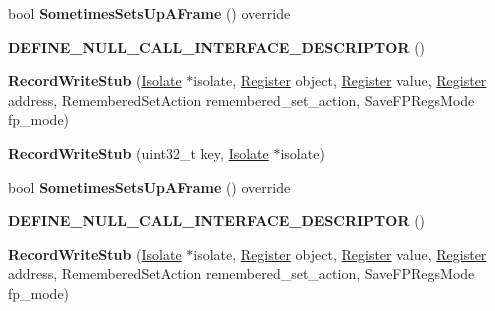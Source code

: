 \begin{DoxyCompactItemize}
\item 
bool {\bfseries Sometimes\+Sets\+Up\+A\+Frame} () override\hypertarget{classv8_1_1internal_1_1_record_write_stub_a636954d69a10f35b09d319f92e167699}{}\label{classv8_1_1internal_1_1_record_write_stub_a636954d69a10f35b09d319f92e167699}

\item 
{\bfseries D\+E\+F\+I\+N\+E\+\_\+\+N\+U\+L\+L\+\_\+\+C\+A\+L\+L\+\_\+\+I\+N\+T\+E\+R\+F\+A\+C\+E\+\_\+\+D\+E\+S\+C\+R\+I\+P\+T\+OR} ()\hypertarget{classv8_1_1internal_1_1_record_write_stub_a886f020173ce417f40c5704f6a582d6f}{}\label{classv8_1_1internal_1_1_record_write_stub_a886f020173ce417f40c5704f6a582d6f}

\item 
{\bfseries Record\+Write\+Stub} (\hyperlink{classv8_1_1internal_1_1_isolate}{Isolate} $\ast$isolate, \hyperlink{structv8_1_1internal_1_1_register}{Register} object, \hyperlink{structv8_1_1internal_1_1_register}{Register} value, \hyperlink{structv8_1_1internal_1_1_register}{Register} address, Remembered\+Set\+Action remembered\+\_\+set\+\_\+action, Save\+F\+P\+Regs\+Mode fp\+\_\+mode)\hypertarget{classv8_1_1internal_1_1_record_write_stub_a6f773cf58e28bfb7b2c5da464fd3f145}{}\label{classv8_1_1internal_1_1_record_write_stub_a6f773cf58e28bfb7b2c5da464fd3f145}

\item 
{\bfseries Record\+Write\+Stub} (uint32\+\_\+t key, \hyperlink{classv8_1_1internal_1_1_isolate}{Isolate} $\ast$isolate)\hypertarget{classv8_1_1internal_1_1_record_write_stub_a9442f95c68a538cf8d22e7f5a7a247b5}{}\label{classv8_1_1internal_1_1_record_write_stub_a9442f95c68a538cf8d22e7f5a7a247b5}

\item 
bool {\bfseries Sometimes\+Sets\+Up\+A\+Frame} () override\hypertarget{classv8_1_1internal_1_1_record_write_stub_a636954d69a10f35b09d319f92e167699}{}\label{classv8_1_1internal_1_1_record_write_stub_a636954d69a10f35b09d319f92e167699}

\item 
{\bfseries D\+E\+F\+I\+N\+E\+\_\+\+N\+U\+L\+L\+\_\+\+C\+A\+L\+L\+\_\+\+I\+N\+T\+E\+R\+F\+A\+C\+E\+\_\+\+D\+E\+S\+C\+R\+I\+P\+T\+OR} ()\hypertarget{classv8_1_1internal_1_1_record_write_stub_a886f020173ce417f40c5704f6a582d6f}{}\label{classv8_1_1internal_1_1_record_write_stub_a886f020173ce417f40c5704f6a582d6f}

\item 
{\bfseries Record\+Write\+Stub} (\hyperlink{classv8_1_1internal_1_1_isolate}{Isolate} $\ast$isolate, \hyperlink{structv8_1_1internal_1_1_register}{Register} object, \hyperlink{structv8_1_1internal_1_1_register}{Register} value, \hyperlink{structv8_1_1internal_1_1_register}{Register} address, Remembered\+Set\+Action remembered\+\_\+set\+\_\+action, Save\+F\+P\+Regs\+Mode fp\+\_\+mode)\hypertarget{classv8_1_1internal_1_1_record_write_stub_a6f773cf58e28bfb7b2c5da464fd3f145}{}\label{classv8_1_1internal_1_1_record_write_stub_a6f773cf58e28bfb7b2c5da464fd3f145}


\end{DoxyCompactItemize}
